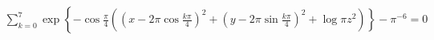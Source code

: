 \begin{align*}  \sum_{k=0}^7 \exp \left\{-\cos \frac{\pi}{4} \left( \left( x - 2\pi \cos \frac{k\pi}{4} \right) ^2 + \left( y - 2\pi \sin \frac{k\pi}{4} \right) ^2 + \log \pi z^2 \right) \right\} - \pi ^{-6} = 0\end{align*}